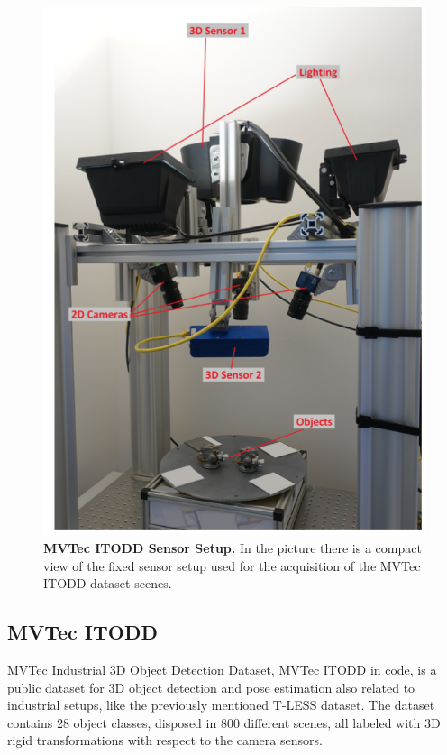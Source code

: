 \begin{figure}
    \centering
    \includegraphics[height=0.4\textheight]{figures/2_benchmarks_and_metrics/itodd_sensor_setup}
    \caption{\textbf{MVTec ITODD Sensor Setup.} In the picture there is a compact view of the fixed sensor setup used for the acquisition of the MVTec ITODD dataset scenes.}
    \label{fig:itodd_sensor_setup}
\end{figure}

\subsection{MVTec ITODD}\label{subsec:mvtex_itodd}
MVTec Industrial 3D Object Detection Dataset, MVTec ITODD \cite{mvtec2017itodd} in code, is a public dataset for 3D object detection and pose estimation also related to industrial setups, like the previously mentioned T-LESS dataset. The dataset contains 28 object classes, disposed in 800 different scenes, all labeled with 3D rigid transformations with respect to the camera sensors.

